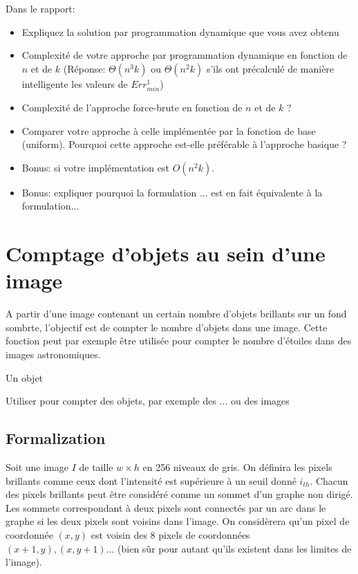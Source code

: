 \documentclass[a4paper,10pt]{article}
\begin{document}
Dans le rapport:
\begin{itemize}
\item Expliquez la solution par programmation dynamique que vous avez obtenu
\item Complexité de votre approche par programmation dynamique en fonction de $n$ et de $k$ (Réponse: $\Theta(n^3 k)$ ou $\Theta(n^2 k)$ s'ils ont précalculé de manière intelligente les valeurs de $Err_{min}^1$)
\item Complexité de l'approche force-brute en fonction de $n$ et de $k$ ?
\item Comparer votre approche à celle implémentée par la fonction de
  base (uniform). Pourquoi cette approche est-elle préférable à
  l'approche basique ?
\item Bonus: si votre implémentation est $O(n^2 k)$.
\item Bonus: expliquer pourquoi la formulation ... est en fait équivalente à la formulation...
\end{itemize}

\section{Comptage d'objets au sein d'une image}

A partir d'une image contenant un certain nombre d'objets brillants sur un fond sombrte, l'objectif est de compter le nombre d'objets dans une image. Cette fonction peut par exemple être utilisée pour compter le nombre d'étoiles dans des images astronomiques.

Un objet 

Utiliser pour compter des objets, par exemple des ... ou des images

\subsection*{Formalization}

Soit une image $I$ de taille $w\times h$ en 256 niveaux de gris. On
définira les pixels brillants comme ceux dont l'intensité est
supérieure à un seuil donné $i_{th}$. Chacun des pixels brillants peut
être considéré comme un sommet d'un graphe non dirigé. Les sommets correspondant à deux pixels
sont connectés par un arc dans le graphe si les deux pixels sont voisins dans
l'image. On considèrera qu'un pixel de coordonnée $(x,y)$ est voisin des 8 pixels de coordonnées $(x+1,y), (x,y+1)...$ (bien sûr pour autant qu'ils existent dans les limites de l'image).
\end{document}
